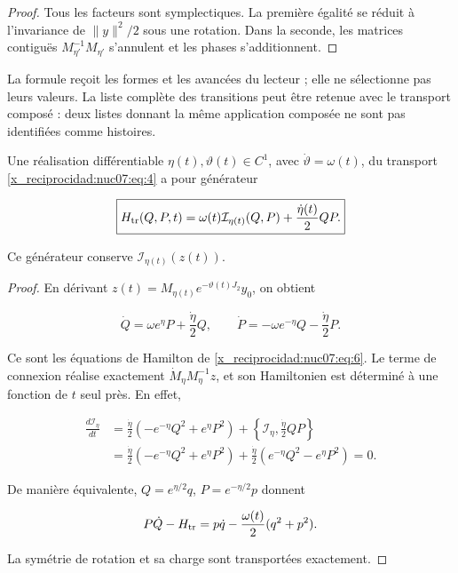 \begin{proof}
Tous les facteurs sont symplectiques. La première égalité se réduit à l’invariance de \(\|y\|^2/2\) sous une rotation. Dans la seconde, les matrices contiguës \(M_{\eta'}^{-1}M_{\eta'}\) s’annulent et les phases s’additionnent.
\end{proof}

La formule reçoit les formes et les avancées du lecteur ; elle ne sélectionne pas leurs valeurs. La liste complète des transitions peut être retenue avec le transport composé : deux listes donnant la même application composée ne sont pas identifiées comme histoires.

\begin{proposition}
Une réalisation différentiable \(\eta(t),\vartheta(t)\in C^1\), avec \(\dot\vartheta=\omega(t)\), du transport \eqref{x_reciprocidad:nuc07:eq:4} a pour générateur

\begin{equation}
\boxed{
H_{\rm tr}(Q,P,t)=
\omega(t)\mathcal I_{\eta(t)}(Q,P)
+\frac{\dot\eta(t)}2 QP.}
\label{x_reciprocidad:nuc07:eq:6}
\end{equation}

Ce générateur conserve \(\mathcal I_{\eta(t)}(z(t))\).
\end{proposition}

\begin{proof}
En dérivant
\(z(t)=M_{\eta(t)}e^{-\vartheta(t)J_2}y_0\), on obtient

\[
\dot Q=\omega e^\eta P+\frac{\dot\eta}2Q,\qquad
\dot P=-\omega e^{-\eta}Q-\frac{\dot\eta}2P.
\]

Ce sont les équations de Hamilton de \eqref{x_reciprocidad:nuc07:eq:6}. Le terme de connexion réalise exactement \(\dot M_\eta M_\eta^{-1}z\), et son Hamiltonien est déterminé à une fonction de \(t\) seul près. En effet,

\begin{equation}
\begin{aligned}
\frac{d\mathcal I_\eta}{dt}
&=\frac{\dot\eta}{2}(-e^{-\eta}Q^2+e^\eta P^2)
+\left\{\mathcal I_\eta,\frac{\dot\eta}{2}QP\right\}\\
&=\frac{\dot\eta}{2}(-e^{-\eta}Q^2+e^\eta P^2)
+\frac{\dot\eta}{2}(e^{-\eta}Q^2-e^\eta P^2)=0.
\end{aligned}
\label{x_reciprocidad:nuc07:eq:7}
\end{equation}

De manière équivalente, \(Q=e^{\eta/2}q\), \(P=e^{-\eta/2}p\) donnent

\begin{equation}
P\dot Q-H_{\rm tr}
=p\dot q-\frac{\omega(t)}2(q^2+p^2).
\label{x_reciprocidad:nuc07:eq:8}
\end{equation}

La symétrie de rotation et sa charge sont transportées exactement.
\end{proof}

